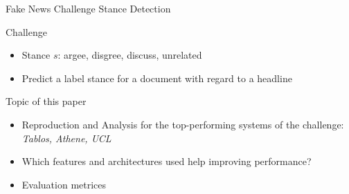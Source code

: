 \documentclass[english,handout]{mlutalk}
\begin{document}
\begin{frame}[allowframebreaks]{Fake News Challenge Stance Detection~\cite{HanselowskiSSCC2018}}
  \begin{example}
  \end{example}
  \begin{block}{Challenge}
    \begin{itemize}
      \item Stance $s$: argee, disgree, discuss, unrelated
      \item Predict a label stance for a document with regard to a headline
    \end{itemize}
  \end{block} %
  \begin{block}{Topic of this paper}
      \begin{itemize}
        \item Reproduction and Analysis for the top-performing systems of the challenge: \textit{Tablos, Athene, UCL}
        \item Which features and architectures used help improving performance?
        \item Evaluation metrices
      \end{itemize}
  \end{block}
  

\end{frame}
\end{document}
